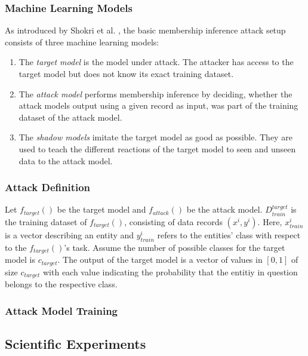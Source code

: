 \documentclass[runningheads]{llncs}
\begin{document}
\subsubsection{Machine Learning Models}

As introduced by Shokri et al. \cite{shokri2017membership}, the basic membership inference attack setup consists of three machine learning models:
\begin{enumerate}
    \item The \textit{target model} is the model under attack. The attacker has access to the target model but does not know its exact training dataset.
    \item The \textit{attack model} performs membership inference by deciding, whether the attack models output using a given record as input, was part of the training dataset of the attack model.
    \item The \textit{shadow models} imitate the target model as good as possible. They are used to teach the different reactions of the target model to seen and unseen data to the attack model.
\end{enumerate}

\subsubsection{Attack Definition}

Let $f_{target}()$ be the target model and $f_{attack}()$ be the attack model. $D_{train}^{target}$ is the training dataset of $f_{target}()$, consisting of data records $(x^{i},y^{i})$. Here, $x_{train}^{i}$ is a vector describing an entity and $y_{train}^{i}$ refers to the entities' class with respect to the $f_{target}()$'s task. Assume the number of possible classes for the target model is $c_{target}$. The output of the target model is a vector of values in $[0, 1]$ of size $c_{target}$ with each value indicating the probability that the entitiy in question belongs to the respective class.

\subsubsection{Attack Model Training}

\subsubsection{}

\subsection{Scientific Experiments}
\end{document}
